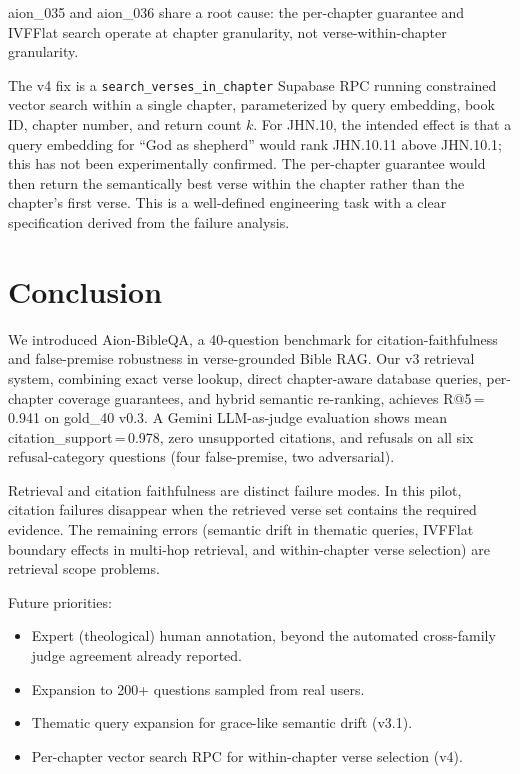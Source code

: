 \documentclass[11pt]{article}
\begin{document}
aion\_035 and aion\_036 share a root cause: the per-chapter guarantee and IVFFlat search operate at chapter granularity, not verse-within-chapter granularity.

The v4 fix is a \texttt{search\_verses\_in\_chapter} Supabase RPC running constrained vector search within a single chapter, parameterized by query embedding, book ID, chapter number, and return count $k$.
For JHN.10, the intended effect is that a query embedding for ``God as shepherd'' would rank JHN.10.11 above JHN.10.1; this has not been experimentally confirmed.
The per-chapter guarantee would then return the semantically best verse within the chapter rather than the chapter's first verse.
This is a well-defined engineering task with a clear specification derived from the failure analysis.

\section{Conclusion}

We introduced Aion-BibleQA, a 40-question benchmark for citation-faithfulness and false-premise robustness in verse-grounded Bible RAG.
Our v3 retrieval system, combining exact verse lookup, direct chapter-aware database queries, per-chapter coverage guarantees, and hybrid semantic re-ranking, achieves R@5\,=\,0.941 on gold\_40 v0.3.
A Gemini LLM-as-judge evaluation shows mean citation\_support\,=\,0.978, zero unsupported citations, and refusals on all six refusal-category questions (four false-premise, two adversarial).

Retrieval and citation faithfulness are distinct failure modes.
In this pilot, citation failures disappear when the retrieved verse set contains the required evidence.
The remaining errors (semantic drift in thematic queries, IVFFlat boundary effects in multi-hop retrieval, and within-chapter verse selection) are retrieval scope problems.

Future priorities:
\begin{itemize}
  \item Expert (theological) human annotation, beyond the automated cross-family judge agreement already reported.
  \item Expansion to 200+ questions sampled from real users.
  \item Thematic query expansion for grace-like semantic drift (v3.1).
  \item Per-chapter vector search RPC for within-chapter verse selection (v4).
\end{itemize}
\end{document}
